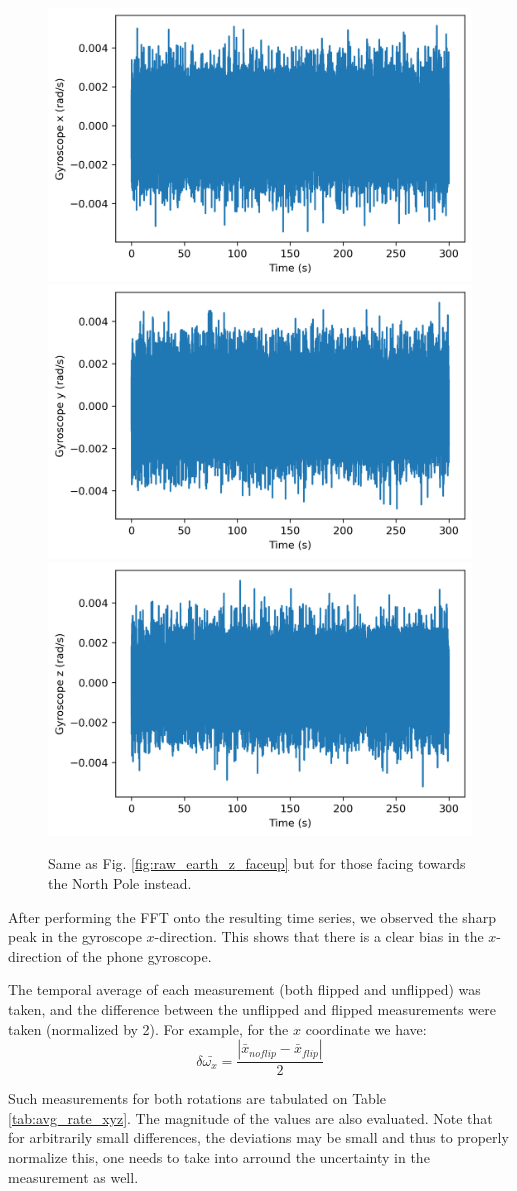 \documentclass[a4paper]{report}
\numberwithin{equation}{section}
\begin{document}
\begin{figure}[hbt!]
     \centering
     {{\includegraphics[width=0.4\columnwidth]{raw_180kx.png}}}
     {{\includegraphics[width=0.4\columnwidth]{raw_180ky.png}}}
     {{\includegraphics[width=0.4\columnwidth]{raw_180kz.png}}}
     \caption{Same as Fig. \ref{fig:raw_earth_z_faceup} but for those facing towards the North Pole instead.}
     \label{fig:raw_earth_z_facedown}
\end{figure}


After performing the FFT onto the resulting time series, we observed the sharp peak in the gyroscope $x$-direction.
This shows that there is a clear bias in the $x$-direction of the phone gyroscope. 

The temporal average of each measurement (both flipped and unflipped) was taken, and the difference between the unflipped and flipped
measurements were taken (normalized by 2). For example, for the $x$ coordinate we have: 
\begin{equation}
     \delta \bar{\omega_x} = \frac{|\bar{x}_{noflip} - \bar{x}_{flip}|}{2}
\end{equation}

Such measurements for both rotations are tabulated on Table \ref{tab:avg_rate_xyz}. The magnitude of the values are also evaluated.
Note that for arbitrarily small differences, the deviations may be small and thus to properly normalize this, one needs to take
into arround the uncertainty in the measurement as well. 
\end{document}
